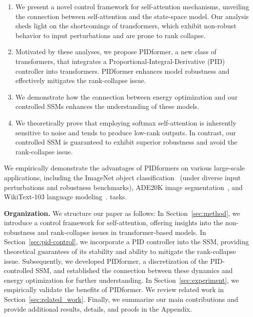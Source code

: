 \vspace{-3mm}
\begin{enumerate}
    \item  We present a novel control framework for self-attention mechanisms, unveiling the connection between self-attention and the state-space model. Our analysis sheds light on the shortcomings of transformers, which exhibit non-robust behavior to input perturbations and are prone to rank collapse. 
    \item Motivated by these analyses, we propose PIDformer, a new class of transformers, that integrates a Proportional-Integral-Derivative (PID) controller into transformers. PIDformer enhances model robustness and effectively mitigates the rank-collapse issue.
    \item We demonstrate how the connection between energy optimization and our controlled SSMs enhances the understanding of these models.
    \item We theoretically prove that employing softmax self-attention is inherently sensitive to noise and tends to produce low-rank outputs. In contrast, our controlled SSM is guaranteed to exhibit superior robustness and avoid the rank-collapse issue.
\end{enumerate}

\vspace{-2mm}
We empirically demonstrate the advantages of PIDformers on various large-scale applications, including the ImageNet object classification~\cite{deng2009imagenet} (under diverse input perturbations and robustness benchmarks), ADE20K image segmentation~\cite{zhou2018semantic}, and WikiText-103 language modeling~\cite{DBLP:conf/iclr/MerityX0S17}. tasks.

\textbf{Organization.}
We structure our paper as follows: In Section~\ref{sec:method}, we introduce a control framework for self-attention, offering insights into the non-robustness and rank-collapse issues in transformer-based models. In Section~\ref{sec:pid-control}, we incorporate a PID controller into the SSM, providing theoretical guarantees of its stability and ability to mitigate the rank-collapse issue. Subsequently, we developed PIDformer, a discretization of the PID-controlled SSM, and established the connection between these dynamics and energy optimization for further understanding. In Section~\ref{sec:experiment}, we empirically validate the benefits of PIDformer. We review related work in Section~\ref{sec:related_work}. Finally, we summarize our main contributions and provide additional results, details, and proofs in the Appendix.